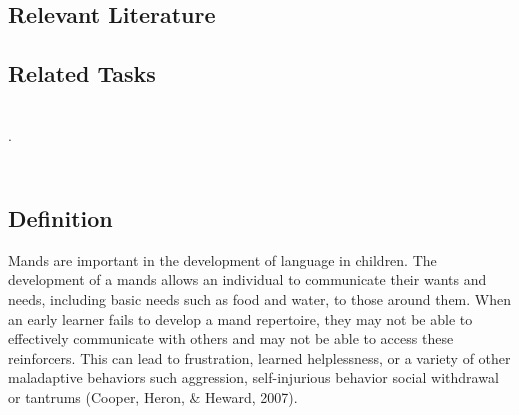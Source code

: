 \subsection{Relevant Literature}
\begin{refsection}
\nocite{test,alang2017police,clayton2018black}
\printbibliography[heading=none]
\end{refsection}
%
%
\subsection{Related Tasks}
\fourdOne{}\\.
\fourdFour{}\\
\fourFKFourtyThree{}\\
%
%
%
%
%
\section{\fourdEleven{}}
\subsection{Definition}
Mands are important in the development of language in children.  The development of a mands allows an individual to communicate their wants and needs, including basic needs such as food and water, to those around them.  When an early learner fails to develop a mand repertoire, they may not be able to effectively communicate with others and may not be able to access these reinforcers.  This can lead to frustration, learned helplessness, or a variety of other maladaptive behaviors such aggression, self-injurious behavior social withdrawal or tantrums (Cooper, Heron, \& Heward, 2007).

